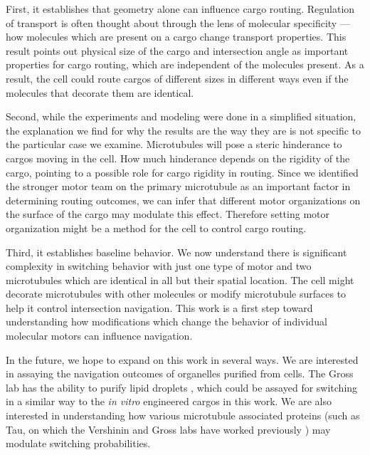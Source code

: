 First, it establishes that geometry alone can influence cargo routing.
Regulation of transport is often thought about through the lens of molecular specificity --- how molecules which are present on a cargo change transport properties.
This result points out physical size of the cargo and intersection angle as important properties for cargo routing, which are independent of the molecules present.
As a result, the cell could route cargos of different sizes in different ways even if the molecules that decorate them are identical.

Second, while the experiments and modeling were done in a simplified situation, the explanation we find for why the results are the way they are is not specific to the particular case we examine.
Microtubules will pose a steric hinderance to cargos moving in the cell.
How much hinderance depends on the rigidity of the cargo, pointing to a possible role for cargo rigidity in routing. 
Since we identified the stronger motor team on the primary microtubule as an important factor in determining routing outcomes, we can infer that different motor organizations on the surface of the cargo may modulate this effect.
Therefore setting motor organization might be a method for the cell to control cargo routing.

Third, it establishes baseline behavior. We now understand there is significant complexity in switching behavior with just one type of motor and two microtubules which are identical in all but their spatial location. The cell might decorate microtubules with other molecules or modify microtubule surfaces to help it control intersection navigation. This work is a first step toward understanding how modifications which change the behavior of individual molecular motors can influence navigation.

In the future, we hope to expand on this work in several ways. We are interested in assaying the navigation outcomes of organelles purified from cells. The Gross lab has the ability to purify lipid droplets \cite{Reddy2016}, which could be assayed for switching in a similar way to the \textit{in vitro} engineered cargos in this work. We are also interested in understanding how various microtubule associated proteins (such as Tau, on which the Vershinin and Gross labs have worked previously \cite{Vershinin2007}) may modulate switching probabilities. 